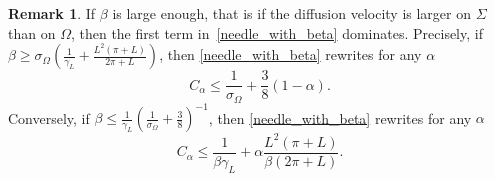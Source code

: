 \documentclass[a4paper]{article}
\theoremstyle{definition}
\newtheorem{remark}[theorem]{Remark}
\numberwithin{equation}{section}
\begin{document}
\begin{remark}
  If $\beta$ is large enough, that is if the diffusion velocity  is larger on $\Sigma$ than on $\Omega$, then the first term in~\eqref{needle_with_beta} dominates. Precisely, if $\beta \geq \sigma_\Omega \left( \frac{1}{\gamma_L} +  \frac{L^2(\pi+L)}{2\pi + L} \right)$, then \eqref{needle_with_beta} rewrites for any $\alpha$
  \[C_\alpha \leq \frac{1}{\sigma_{\Omega}} + \frac{3}{8}(1-\alpha).
  \]
  Conversely, if $\beta \leq \frac{1}{\gamma_L} \left(\frac{1}{\sigma_{\Omega}} + \frac{3}{8}\right)^{-1}$, then  \eqref{needle_with_beta} rewrites for any $\alpha$
  \[C_\alpha \leq \frac{1}{\beta\gamma_L} + \alpha \frac{L^2(\pi+L)}{\beta(2\pi + L)}.
  \]
\end{remark}





\nocite{MR2255233,MR2255233,MR1988680,MR3498008,MR2029716,MR2277314}




%
\end{document}
